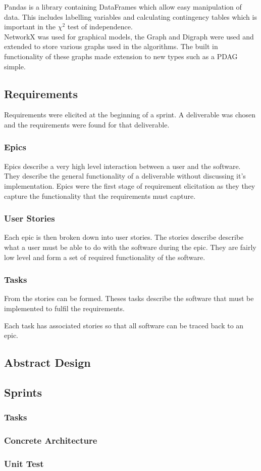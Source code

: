 \documentclass{article}
\begin{document}
Pandas is a library containing DataFrames which allow easy manipulation of data. This includes labelling variables and calculating contingency tables which is important in the $\chi^2$ test of independence.\\

NetworkX was used for graphical models, the Graph and Digraph were used and extended to store various graphs used in the algorithms. The built in functionality of these graphs made extension to new types such as a PDAG simple.\\

\subsection{Requirements}
Requirements were elicited at the beginning of a sprint. A deliverable was chosen and the requirements were found for that deliverable.

\subsubsection{Epics}
Epics describe a very high level interaction between a user and the software. They describe the general functionality of a deliverable without discussing it's implementation. Epics were the first stage of requirement elicitation as they they capture the functionality that the requirements must capture.
\subsubsection{User Stories}
Each epic is then broken down into user stories. The stories describe describe what a user must be able to do with the software during the epic. They are fairly low level and form a set of required functionality of the software.

\subsubsection{Tasks}
From the stories can be formed. Theses tasks describe the software that must be implemented to fulfil the requirements. 

Each task has associated stories so that all software can be traced back to an epic.
\subsection{Abstract Design}

\subsection{Sprints}
\subsubsection{Tasks}
\subsubsection{Concrete Architecture}
\subsubsection{Unit Test}
\end{document}
